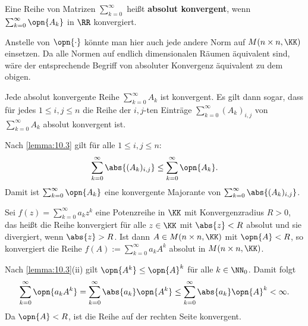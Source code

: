 \begin{definition}
	\label{def:10.4}
	Eine Reihe von Matrizen $\sum_{k=0}^{\infty}$ heißt \textbf{absolut konvergent}, wenn $\sum_{k=0}^{\infty} \opn{A_k}$ in $\RR$ konvergiert. 
\end{definition}

\begin{bemerkung}
	\label{bem:10.5}
	Anstelle von $\opn{\cdot}$ könnte man hier auch jede andere Norm auf $M(n \times n, \KK)$ einsetzen.
	Da alle Normen auf endlich dimensionalen Räumen äquivalent sind, wäre der entsprechende Begriff von absoluter Konvergenz äquivalent zu dem obigen.
\end{bemerkung}

\begin{satz}
	\label{satz:10.6}
	Jede absolut konvergente Reihe $\sum_{k=0}^{\infty} A_k$ ist konvergent.
	Es gilt dann sogar, dass für jedes $1 \leq i,j \leq n$ die Reihe der $i,j$-ten Einträge $\sum_{k=0}^{\infty} (A_k)_{i,j}$ von $\sum_{k=0}^{\infty} A_k$ absolut konvergent ist.
\end{satz}

\begin{beweis}
	Nach \autoref{lemma:10.3} gilt für alle $1 \leq i,j \leq n$:
	\[
		\sum_{k=0}^{\infty} \abs{(A_k)_{i,j}} \leq \sum_{k=0}^{\infty} \opn{A_k}.
	\]
	Damit ist $\sum_{k=0}^{\infty} \opn{A_k}$ eine konvergente Majorante von $\sum_{k=0}^{\infty} \abs{(A_k)_{i,j}}$.	
\end{beweis}

\begin{korollar}
	\label{kor:10.7}
	Sei $f(z) = \sum_{k=0}^{\infty} a_kz^k$ eine Potenzreihe in $\KK$ mit Konvergenzradius $R > 0$, das heißt die Reihe konvergiert für alle $z \in \KK$ mit $\abs{z} < R$ absolut und sie divergiert, wenn $\abs{z} > R$. 
	Ist dann $A \in M(n \times n,\KK)$ mit $\opn{A} < R$, so konvergiert die Reihe $f(A) := \sum_{k=0}^{\infty} a_k A^k$ absolut in $M(n \times n,\KK)$.
\end{korollar}

\begin{beweis}
	Nach \autoref{lemma:10.3}(ii) gilt $\opn{A^k} \leq \opn{A}^k$ für alle $k \in \NN_0$.
	Damit folgt
	\[
		\sum_{k=0}^{\infty} \opn{a_k A^k} = \sum_{k=0}^{\infty} \abs{a_k} \opn{A^k} \leq \sum_{k=0}^{\infty} \abs{a_k} \opn{A}^k < \infty.
	\]
	Da $\opn{A} < R$, ist die Reihe auf der rechten Seite konvergent. 
\end{beweis}

